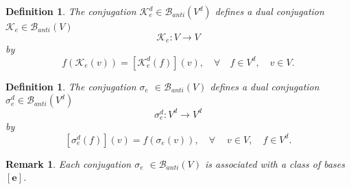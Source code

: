 \documentclass[aps,preprint]{revtex4}%
\newtheorem{definition}[theorem]{Definition}
\newtheorem{remark}[theorem]{Remark}
\begin{document}
\begin{definition}
The conjugation $\mathcal{K}_{e}^{d}\in\mathcal{B}_{anti}\left(  V^{d}\right)
$ defines a dual conjugation $\mathcal{K}_{e}\in\mathcal{B}_{anti}\left(
V\right)  $%
\begin{equation}
\mathcal{K}_{e}:V\rightarrow V
\end{equation}
by%
\begin{equation}
f\left(  \mathcal{K}_{e}\left(  v\right)  \right)  =\left[  \mathcal{K}%
_{e}^{d}\left(  f\right)  \right]  \left(  v\right)  ,\quad\forall\quad f\in
V^{d},\quad v\in V.
\end{equation}

\end{definition}

\begin{definition}
The conjugation $\mathcal{\sigma}_{e}$ $\in\mathcal{B}_{anti}\left(  V\right)
$ defines a dual conjugation $\mathcal{\sigma}_{e}^{d}\in\mathcal{B}%
_{anti}\left(  V^{d}\right)  $%
\begin{equation}
\mathcal{\sigma}_{e}^{d}:V^{d}\rightarrow V^{d}%
\end{equation}
by%
\begin{equation}
\left[  \mathcal{\sigma}_{e}^{d}\left(  f\right)  \right]  \left(  v\right)
=f\left(  \mathcal{\sigma}_{e}\left(  v\right)  \right)  ,\quad\forall
\quad\ v\in V,\quad f\in V^{d}.
\end{equation}

\end{definition}

\begin{remark}
Each conjugation $\mathcal{\sigma}_{e}$ $\in\mathcal{B}_{anti}\left(
V\right)  $ is associated with a class of bases $\left[  \boldsymbol{e}%
\right]  $.
\end{remark}
\end{document}
